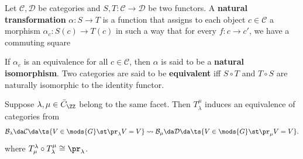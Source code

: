 \begin{definition}

Let \(\mathcal{C}, \mathcal{D}\) be categories and
\(S, T:\mathcal{C} \to \mathcal{D}\) be two functors. A \textbf{natural
transformation} \(\alpha:S\to T\) is a function that assigns to each
object \(c\in \mathcal{C}\) a morphism \(\alpha_c:S(c) \to T(c)\) in
such a way that for every \(f:c\to c'\), we have a commuting square

\begin{center}\end{center}

If \(\alpha_c\) is an equivalence for all \(c\in \mathcal{C}\), then
\(\alpha\) is said to be a \textbf{natural isomorphism}. Two categories
are said to be \textbf{equivalent} iff \(S\circ T\) and \(T\circ S\) are
naturally isomorphic to the identity functor.

\end{definition}

\begin{theorem}[?]

Suppose \(\lambda, \mu \in \bar{C}_\ZZ\) belong to the same facet. Then
\(T_\lambda^\mu\) induces an equivalence of categories from
\begin{align*}  
\mathcal{B}_\lambda \da \mathcal{C} \da \ts{V\in \mods{G} \st \pr_\lambda V = V} \leadsto
\mathcal{B}_\mu \da \mathcal{D} \da \ts{V\in \mods{G} \st \pr_\mu V = V}
.\end{align*} where
\(T_\mu^\lambda \circ T_\lambda^\mu \cong \pr_\lambda\).

\end{theorem}

